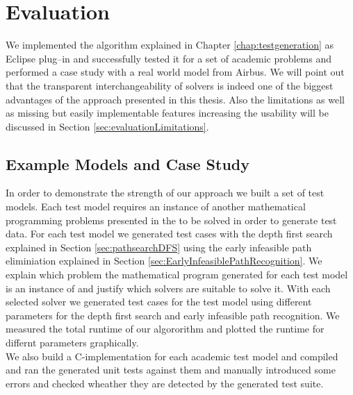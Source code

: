 \chapter{Evaluation}
\label{chap:evaluation}
We implemented the algorithm explained in Chapter \ref{chap:testgeneration} as Eclipse plug--in and successfully tested it for a set of academic problems and performed a case study with a real world model from Airbus. We will point out that the transparent interchangeability of solvers is indeed one of the biggest advantages of the approach presented in this thesis. Also the limitations as well as missing but easily implementable features increasing the usability will be discussed in Section \ref{sec:evaluationLimitations}.\\
\section{Example Models and Case Study}
In order to demonstrate the strength of our approach we built a set of test models. Each test model requires an instance of another mathematical programming problems presented in the  to be solved in order to generate test data. For each test model we generated test cases with the depth first search explained in Section \ref{sec:pathsearchDFS} using the early infeasible path eliminiation explained in Section \ref{sec:EarlyInfeasiblePathRecognition}. We explain which problem the mathematical program generated for each test model is an instance of and justify which solvers are suitable to solve it. With each selected solver we generated test cases for the test model using different parameters for the depth first search and early infeasible path recognition. We measured the total runtime of our algororithm and plotted the runtime for differnt parameters graphically.\\
We also build a C-implementation for each academic test model and compiled and ran the generated unit tests against them and manually introduced some errors and checked wheather they are detected by the generated test suite.
